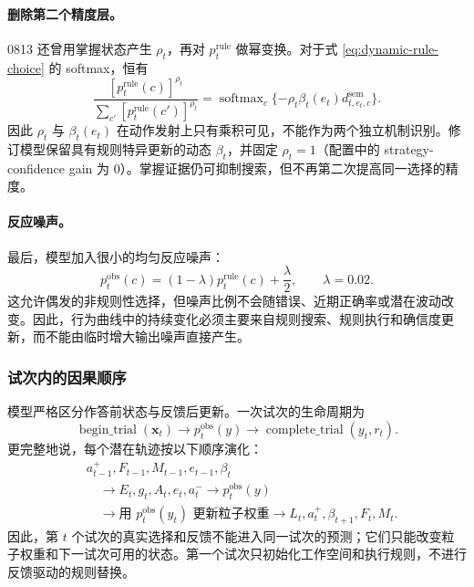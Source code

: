 \paragraph{删除第二个精度层。}
0813 还曾用掌握状态产生 $\rho_t$，再对 $p_t^{\mathrm{rule}}$ 做幂变换。对于式 \ref{eq:dynamic-rule-choice} 的 softmax，恒有
\begin{equation}
\frac{[p_t^{\mathrm{rule}}(c)]^{\rho_t}}
{\sum_{c'}[p_t^{\mathrm{rule}}(c')]^{\rho_t}}
=\operatorname{softmax}_{c}\{-\rho_t\beta_t(e_t)d^{\mathrm{sem}}_{t,e_t,c}\}.
\label{eq:dynamic-redundant-precision}
\end{equation}
因此 $\rho_t$ 与 $\beta_t(e_t)$ 在动作发射上只有乘积可见，不能作为两个独立机制识别。修订模型保留具有规则特异更新的动态 $\beta_t$，并固定 $\rho_t=1$（配置中的 strategy-confidence gain 为 0）。掌握证据仍可抑制搜索，但不再第二次提高同一选择的精度。

\paragraph{反应噪声。}
最后，模型加入很小的均匀反应噪声：
\begin{equation}
p_t^{\mathrm{obs}}(c)
=(1-\lambda)p_t^{\mathrm{rule}}(c)+\frac{\lambda}{2},
\qquad \lambda=0.02.
\label{eq:dynamic-output-lapse}
\end{equation}
这允许偶发的非规则性选择，但噪声比例不会随错误、近期正确率或潜在波动改变。因此，行为曲线中的持续变化必须主要来自规则搜索、规则执行和确信度更新，而不能由临时增大输出噪声直接产生。


\subsubsection{试次内的因果顺序}

模型严格区分作答前状态与反馈后更新。一次试次的生命周期为
\begin{equation}
\operatorname{begin\_trial}(\mathbf x_t)
\longrightarrow p_t^{\mathrm{obs}}(y)
\longrightarrow
\operatorname{complete\_trial}(y_t,r_t).
\label{eq:dynamic-lifecycle}
\end{equation}
更完整地说，每个潜在轨迹按以下顺序演化：
\begin{equation}
\begin{aligned}
&a_{t-1}^{+},F_{t-1},M_{t-1},e_{t-1},\beta_t
\\
&\quad\longrightarrow
E_t,g_t,A_t,e_t,a_t^{-}
\longrightarrow p_t^{\mathrm{obs}}(y)
\\
&\quad\longrightarrow
\text{用 }p_t^{\mathrm{obs}}(y_t)\text{ 更新粒子权重}
\longrightarrow L_t,a_t^{+},\beta_{t+1},F_t,M_t.
\end{aligned}
\label{eq:dynamic-causal-order}
\end{equation}
因此，第 $t$ 个试次的真实选择和反馈不能进入同一试次的预测；它们只能改变粒子权重和下一试次可用的状态。第一个试次只初始化工作空间和执行规则，不进行反馈驱动的规则替换。


